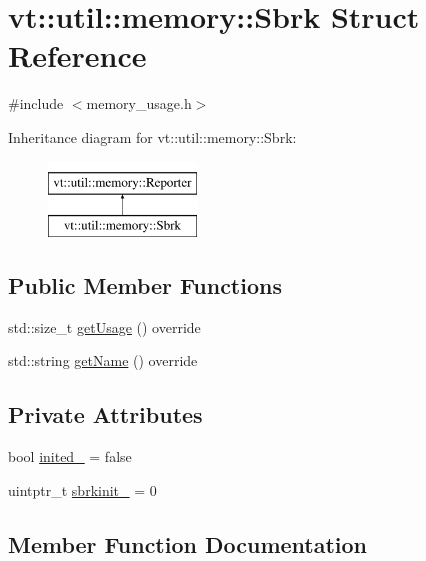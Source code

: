 \hypertarget{structvt_1_1util_1_1memory_1_1_sbrk}{}\section{vt\+:\+:util\+:\+:memory\+:\+:Sbrk Struct Reference}
\label{structvt_1_1util_1_1memory_1_1_sbrk}


{\ttfamily \#include $<$memory\+\_\+usage.\+h$>$}

Inheritance diagram for vt\+:\+:util\+:\+:memory\+:\+:Sbrk\+:\begin{figure}[H]
\begin{center}
\leavevmode
\includegraphics[height=2.000000cm]{structvt_1_1util_1_1memory_1_1_sbrk}
\end{center}
\end{figure}
\subsection*{Public Member Functions}
\begin{DoxyCompactItemize}
\item 
std\+::size\+\_\+t \hyperlink{structvt_1_1util_1_1memory_1_1_sbrk_af4df47e41f60e7f2da7a6b47c8b4a046}{get\+Usage} () override
\item 
std\+::string \hyperlink{structvt_1_1util_1_1memory_1_1_sbrk_a21fc8bafbdf0a4bb92184474dae1d0f1}{get\+Name} () override
\end{DoxyCompactItemize}
\subsection*{Private Attributes}
\begin{DoxyCompactItemize}
\item 
bool \hyperlink{structvt_1_1util_1_1memory_1_1_sbrk_a094b373315eb32e9d570dbff59d4a0bb}{inited\+\_\+} = false
\item 
uintptr\+\_\+t \hyperlink{structvt_1_1util_1_1memory_1_1_sbrk_a583d05e2d35145d77402a3a84b3399ae}{sbrkinit\+\_\+} = 0
\end{DoxyCompactItemize}


\subsection{Member Function Documentation}
\mbox{\label{structvt_1_1util_1_1memory_1_1_sbrk_a21fc8bafbdf0a4bb92184474dae1d0f1}} 
